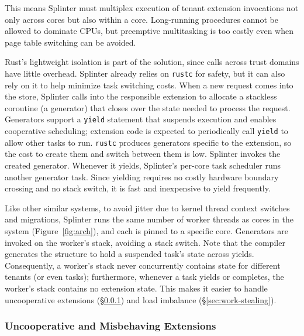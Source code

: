 This means Splinter must multiplex execution of tenant extension invocations
  not only across cores but also within a core.
Long-running procedures cannot be allowed to dominate CPUs, but
  preemptive multitasking is too costly even when page table switching can
  be avoided.

Rust's lightweight isolation is part of the solution, since calls across
  trust domains have little overhead.
Splinter already relies on \texttt{rustc} for safety, but it can also rely on
  it to help minimize task switching costs.
When a new request comes into the store, Splinter calls into the responsible extension
  to allocate a stackless coroutine (a generator) that closes
  over the state needed to process the request.
Generators support a
  \texttt{yield} statement that suspends execution and enables
  cooperative scheduling;
  extension code is expected to periodically call \texttt{yield} to
  allow other tasks to run.
\texttt{rustc} produces generators specific to the extension, so the
  cost to create them and switch between them is low.
Splinter invokes the created generator.
Whenever it yields,
  Splinter's per-core task scheduler runs another generator task.
Since yielding requires no costly hardware boundary crossing and no stack
  switch, it is fast and inexpensive to yield frequently.


Like other similar systems, to avoid jitter due to kernel thread context
    switches and migrations, Splinter runs
    the same number of
  worker threads as cores in the system (Figure~\ref{fig:arch}), and each is
  pinned to a specific core.
Generators are invoked on the worker's stack, avoiding a stack switch.
Note that the compiler generates the structure to hold a suspended
  task's state across yields.
Consequently, a worker's stack never concurrently contains state for
  different tenants (or even tasks); furthermore, whenever a task
  yields or completes, the worker's stack contains no extension state.
This makes it easier to handle uncooperative extensions (\S\ref{sec:uncoop})
  and load imbalance (\S\ref{sec:work-stealing}).

\subsubsection{Uncooperative and Misbehaving Extensions}
\label{sec:uncoop}

